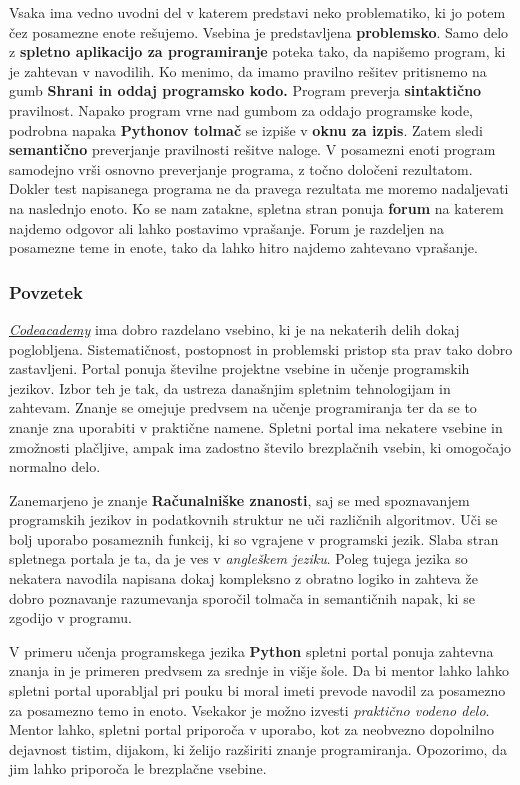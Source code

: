 Vsaka ima vedno uvodni del v katerem predstavi neko problematiko, ki
jo potem čez posamezne enote rešujemo. Vsebina je predstavljena
\textbf{problemsko}. Samo delo z \textbf{spletno aplikacijo za
  programiranje} poteka tako, da napišemo program, ki je zahtevan v
navodilih. Ko menimo, da imamo pravilno rešitev pritisnemo na gumb
\textbf{Shrani in oddaj programsko kodo.} Program preverja
\textbf{sintaktično} pravilnost. Napako program vrne nad gumbom za
oddajo programske kode, podrobna napaka \textbf{Pythonov tolmač} se
izpiše v \textbf{oknu za izpis}. Zatem sledi \textbf{semantično}
preverjanje pravilnosti rešitve naloge. V posamezni enoti program
samodejno vrši osnovno preverjanje programa, z točno določeni
rezultatom. Dokler test napisanega programa ne da pravega rezultata me
moremo nadaljevati na naslednjo enoto. Ko se nam zatakne, spletna stran
ponuja \textbf{forum} na katerem najdemo odgovor ali lahko postavimo
vprašanje. Forum je razdeljen na posamezne teme in enote, tako da
lahko hitro najdemo zahtevano vprašanje.



\subsubsection{Povzetek}

\emph{\href{https://www.codecademy.com/}{Codeacademy}}
\cite{web:codeacademy} ima dobro razdelano vsebino, ki je na nekaterih
delih dokaj poglobljena. Sistematičnost, postopnost in problemski
pristop sta prav tako dobro zastavljeni. Portal ponuja številne
projektne vsebine in učenje programskih jezikov. Izbor teh je tak, da
ustreza današnjim spletnim tehnologijam in zahtevam. Znanje se omejuje
predvsem na učenje programiranja ter da se to znanje zna uporabiti v
praktične namene. Spletni portal ima nekatere vsebine in zmožnosti
plačljive, ampak ima zadostno število brezplačnih vsebin, ki omogočajo
normalno delo.


Zanemarjeno je znanje \textbf{Računalniške znanosti}, saj se med
spoznavanjem programskih jezikov in podatkovnih struktur ne uči
različnih algoritmov. Uči se bolj uporabo posameznih funkcij, ki so
vgrajene v programski jezik. Slaba stran spletnega portala je ta, da
je ves v \emph{angleškem jeziku}. Poleg tujega jezika so nekatera
navodila napisana dokaj kompleksno z obratno logiko in zahteva že
dobro poznavanje razumevanja sporočil tolmača in semantičnih napak, ki
se zgodijo v programu.


V primeru učenja programskega jezika \textbf{Python} spletni portal
ponuja zahtevna znanja in je primeren predvsem za srednje in višje
šole. Da bi mentor lahko lahko spletni portal uporabljal pri pouku bi
moral imeti prevode navodil za posamezno za posamezno temo in
enoto. Vsekakor je možno izvesti \emph{praktično vodeno delo}. Mentor
lahko, spletni portal priporoča v uporabo, kot za neobvezno dopolnilno
dejavnost tistim, dijakom, ki želijo razširiti znanje
programiranja. Opozorimo, da jim lahko priporoča le brezplačne
vsebine.


